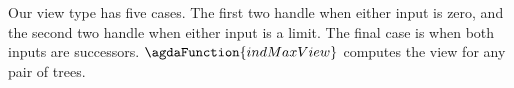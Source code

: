 \begin{code}
%
\>[19]\AgdaSymbol{\{}\AgdaSpace{}%
\AgdaSymbol{:}\AgdaSpace{}%
\AgdaSymbol{\}}\AgdaSpace{}%
\AgdaSymbol{\{}\AgdaSpace{}%
\AgdaSymbol{:}\AgdaSpace{}%
\AgdaSpace{}%
\AgdaSpace{}%
\AgdaSpace{}%
\AgdaSymbol{\}}\AgdaSpace{}%
\AgdaSpace{}%
\AgdaSpace{}%
\AgdaSymbol{(}\AgdaSpace{}%
\AgdaSpace{}%
%
\>[62]\AgdaSpace{}%
\AgdaSymbol{))}\<%
\\
%
\>[12]\AgdaSpace{}%
\AgdaSpace{}%
\AgdaSpace{}%
\AgdaSymbol{(}\AgdaSpace{}%
\AgdaSpace{}%
\AgdaSymbol{)}\<%
\\
%
\>[10]\AgdaSpace{}%
\AgdaSymbol{:}\AgdaSpace{}%
%
\>[29]\AgdaSymbol{\{}\AgdaSpace{}%
\AgdaSpace{}%
\AgdaSymbol{\}}\AgdaSpace{}%
\AgdaSpace{}%
\AgdaSpace{}%
\AgdaSymbol{(}\AgdaSpace{}%
\AgdaSymbol{)}\AgdaSpace{}%
\AgdaSymbol{(}\AgdaSpace{}%
\AgdaSymbol{)}\<%
\\
%
\>[4]\<%
\\
%
\\[\AgdaEmptyExtraSkip]%
\>[4][@{}l@{\AgdaIndent{0}}]%
\>[8]\AgdaSpace{}%
\AgdaSymbol{:}\AgdaSpace{}%
\AgdaSpace{}%
\AgdaSpace{}%
\AgdaSpace{}%
\AgdaSpace{}%
\AgdaSpace{}%
\AgdaSpace{}%
\<%
\end{code}
Our view type has five cases. The first two handle when either input
is zero, and the second two handle when either input is a limit.
The final case is when both inputs are successors.
$\agdaFunction{indMaxView}$ computes the view for any pair of trees.

